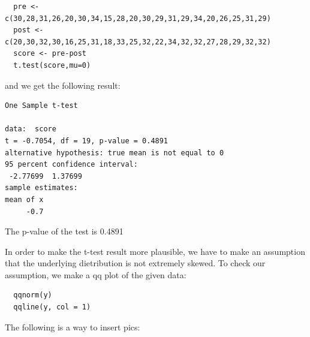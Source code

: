 \documentclass[letterpaper,11pt]{article}
\begin{document}
  \begin{lstlisting}
  pre <- c(30,28,31,26,20,30,34,15,28,20,30,29,31,29,34,20,26,25,31,29)
  post <- c(20,30,32,30,16,25,31,18,33,25,32,22,34,32,32,27,28,29,32,32)
  score <- pre-post
  t.test(score,mu=0)
  \end{lstlisting}

  and we get the following result:

\begin{lstlisting}
One Sample t-test

data:  score
t = -0.7054, df = 19, p-value = 0.4891
alternative hypothesis: true mean is not equal to 0
95 percent confidence interval:
 -2.77699  1.37699
sample estimates:
mean of x
     -0.7
\end{lstlisting}

The p-value of the test is 0.4891\par
In order to make the t-test result more plausible, we have to make an assumption that the underlying dietribution is not extremely skewed. To check our assumption, we make a qq plot of the given data:\par

\begin{lstlisting}
  qqnorm(y)
  qqline(y, col = 1)
\end{lstlisting}


The following is a way to insert pics:
\begin{center}
\end{center}
\end{document}
